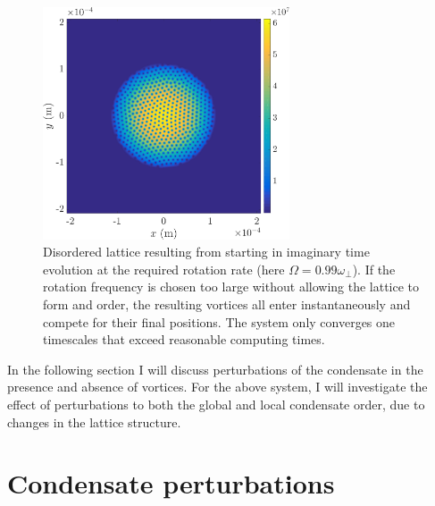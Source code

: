 \begin{figure}
    \centering
    \includegraphics[width=0.65\textwidth]{Images/ch4_vtx/toofast_099_1e7}
    \caption{Disordered lattice resulting from starting in imaginary time evolution at the required rotation rate (here $\Omega=0.99\omega_\perp$). If the rotation frequency is chosen too large without allowing the lattice to form and order, the resulting vortices all enter instantaneously and compete for their final positions. The system only converges one timescales that exceed reasonable computing times.}
    \label{fig:malformed_lattice}
\end{figure}

In the following section I will discuss perturbations of the condensate in the presence and absence of vortices. For the above system, I will investigate the effect of perturbations to both the global and local condensate order, due to changes in the lattice structure.

\section{Condensate perturbations}
